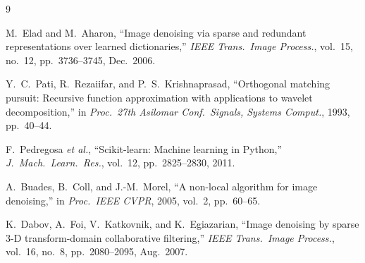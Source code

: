 \documentclass[conference]{IEEEtran}
\begin{document}
\begin{thebibliography}{9}

M.~Elad and M.~Aharon,
``Image denoising via sparse and redundant representations over
  learned dictionaries,''
\emph{IEEE Trans.\ Image Process.},
vol.~15, no.~12, pp.~3736--3745, Dec.~2006.

Y.~C.~Pati, R.~Rezaiifar, and P.~S.~Krishnaprasad,
``Orthogonal matching pursuit: Recursive function approximation with
  applications to wavelet decomposition,''
in \emph{Proc.\ 27th Asilomar Conf.\ Signals, Systems Comput.},
1993, pp.~40--44.

F.~Pedregosa \emph{et al.},
``Scikit-learn: Machine learning in {Python},''
\emph{J.\ Mach.\ Learn.\ Res.},
vol.~12, pp.~2825--2830, 2011.

A.~Buades, B.~Coll, and J.-M.~Morel,
``A non-local algorithm for image denoising,''
in \emph{Proc.\ IEEE CVPR}, 2005, vol.~2, pp.~60--65.

K.~Dabov, A.~Foi, V.~Katkovnik, and K.~Egiazarian,
``Image denoising by sparse 3-D transform-domain collaborative
  filtering,''
\emph{IEEE Trans.\ Image Process.}, vol.~16, no.~8,
pp.~2080--2095, Aug.~2007.

\end{thebibliography}
\end{document}
